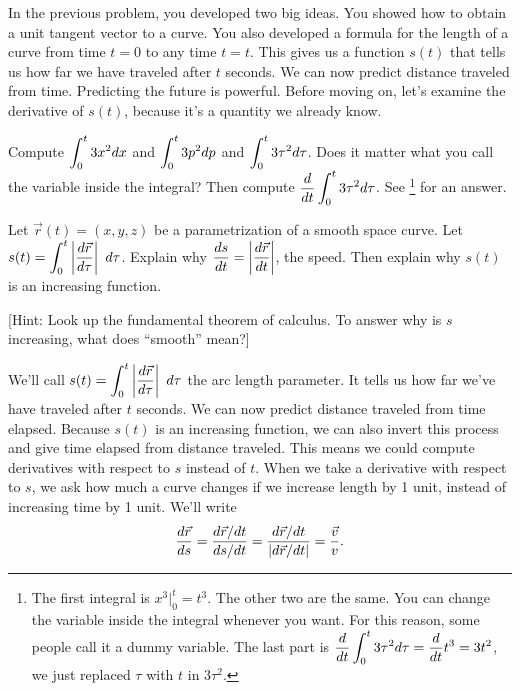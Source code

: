 In the previous problem, you developed two big ideas.  You showed how to obtain a unit tangent vector to a curve. You also developed a formula for the length of a curve from time $t=0$ to any time $t=t$.  This gives us a function $s(t)$ that tells us how far we have traveled after $t$ seconds. We can now predict distance traveled from time. Predicting the future is powerful. Before moving on, let's examine the derivative of $s(t)$, because it's a quantity we already know.

\begin{review*}
 Compute $\displaystyle \int_0^t 3x^2 dx$ and $\displaystyle \int_0^t 3p^2 dp$ and $\displaystyle \int_0^t 3\tau^2 d\tau$. 
 Does it matter what you call the variable inside the integral? 
 Then compute $\displaystyle\frac{d}{dt} \int_0^t 3\tau^2 d\tau$. See 
\footnote{
The first integral is $x^3|_0^t = t^3$. The other two are the same. You can change the variable inside the integral whenever you want.  For this reason, some people call it a dummy variable. 
The last part is $\displaystyle\frac{d}{dt} \int_0^t 3\tau^2 d\tau = \frac{d}{dt} t^3 = 3t^2$, 
we just replaced $\tau$ with $t$ in $3\tau^2$.}
for an answer. 
\end{review*}


\begin{problem}\label{fundamental theorem of calculus as it applies to arc length parameter}%
 Let $\vec r(t)=(x,y,z)$ be a parametrization of a smooth space curve. Let $\displaystyle s(t)=\int_0^t \left|\frac {d\vec r}{d\tau} \right|\ d\tau$.  Explain why $\displaystyle\frac{ds}{dt} = \left|\frac {d\vec r}{dt} \right|$, the speed. Then explain why $s(t)$ is an increasing function.

 [Hint: Look up the fundamental theorem of calculus. To answer why is $s$ increasing, what does ``smooth'' mean?] 
\end{problem}

We'll call $\displaystyle s(t)=\int_0^t \left|\frac {d\vec r}{d\tau}\right|\ d\tau$ the arc length parameter.  It tells us how far we've have traveled after $t$ seconds. We can now predict distance traveled from time elapsed. Because $s(t)$ is an increasing function, we can also invert this process and give time elapsed from distance traveled. This means we could compute derivatives with respect to $s$ instead of $t$.  
When we take a derivative with respect to $s$, we ask how much a curve changes if we increase length by 1 unit, instead of increasing time by 1 unit.  We'll write
$$\displaystyle\frac{d\vec r}{ds} =\displaystyle\frac{d\vec r/dt}{ds/dt} = \frac{d\vec r/dt}{|d\vec r/dt|} = \frac{\vec v}{v}.$$

